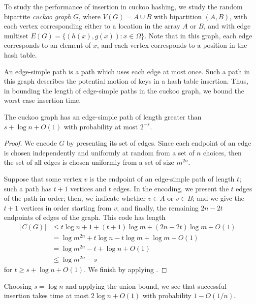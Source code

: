 To study the performance of insertion in cuckoo hashing, we study the
random bipartite \emph{cuckoo graph} $G$, where $V(G) = A \cup B$ with
bipartition $(A, B)$, with each vertex corresponding either to a
location in the array $A$ or $B$, and with edge multiset
$E(G) = \{(h(x), g(x)) : x \in \Omega\}$. Note that in this graph,
each edge corresponds to an element of $x$, and each vertex
corresponds to a position in the hash table.

An edge-simple path is a path which uses each edge at most once. Such
a path in this graph describes the potential motion of keys in a hash
table insertion. Thus, in bounding the length of edge-simple paths in
the cuckoo graph, we bound the worst case insertion time.
\begin{lem}
  The cuckoo graph has an edge-simple path of length greater than
  $s + \log n + O(1)$ with probability at most $2^{-s}$.
\end{lem}
\begin{proof}
  We encode $G$ by presenting its set of edges. Since each endpoint of
  an edge is chosen independently and uniformly at random from a set
  of $n$ choices, then the set of all edges is chosen uniformly from a
  set of size $m^{2n}$.

  Suppose that some vertex $v$ is the endpoint of an edge-simple path
  of length $t$; such a path has $t + 1$ vertices and $t$ edges. In
  the encoding, we present the $t$ edges of the path in order; then,
  we indicate whether $v \in A$ or $v \in B$; and we give the $t + 1$
  vertices in order starting from $v$; and finally, the remaining
  $2n - 2t$ endpoints of edges of the graph. This code has length
  \begin{align*}
    |C(G)| &\leq t \log n + 1 + (t + 1) \log m + (2n - 2t) \log m + O(1)\\
           &= \log m^{2n} + t \log n - t \log m + \log m + O(1) \\
           &= \log m^{2n} - t + \log n + O(1) \tag{since $m = 2n$} \\
           &\leq \log m^{2n} - s
  \end{align*}
  for $t \geq s + \log n + O(1)$. We finish by applying .
\end{proof}

Choosing $s = \log n$ and applying the union bound, we see that
successful insertion takes time at most $2 \log n + O(1)$ with
probability $1 - O(1/n)$.

